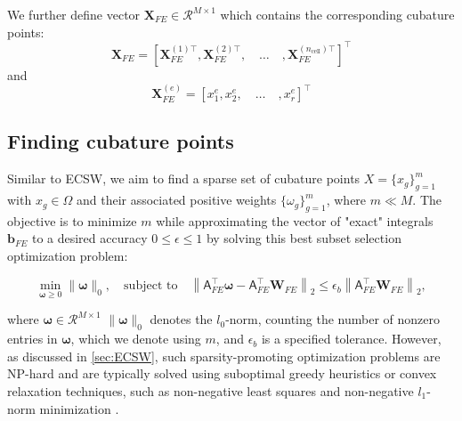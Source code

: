 \documentclass[11pt]{article}
\renewcommand{\vec}[1]{\mathbf{#1}}
\newcommand{\mat}[1]{\mathsf{#1}}
\begin{document}
            We further define vector $\vec{X}_{FE}\in\mathcal{R}^{M\times 1}$ which contains  the corresponding cubature points:
            \begin{equation}
            \mathbf{X}_{FE} = \left[\vec{X}_{FE}^{(1)\top},
            \vec{X}_{FE}^{(2)\top},\quad
            \hdots\quad
            ,\vec{X}_{FE}^{(n_{\text{cell}})\top}\right]^\top
            \label{eq:X_points}
            \end{equation}
            and
            \begin{equation}
            \vec{X}_{FE}^{(e)} = \left[ x_1^e, x_2^e, \quad\hdots\quad, x_r^e \right]^\top
            \end{equation}





            \subsection*{Finding cubature points}
            Similar to ECSW, we aim to find a sparse set of cubature points \( X = \{ x_g \}_{g=1}^{m} \) with \( x_g \in \Omega \) and their associated positive weights \( \{ \omega_g \}_{g=1}^{m} \), where \( m \ll M \).
            The objective is to minimize \( m \) while approximating the vector of "exact" integrals \( \mathbf{b}_{FE} \) to a desired accuracy \( 0 \leq \epsilon \leq 1 \) by solving this best subset selection optimization problem:










            \begin{equation}
            \min_{\boldsymbol{\omega} \geq 0} \| \boldsymbol{\omega} \|_0, \quad \text{subject to} \quad \left\| \mat{A}_{FE}^\top \boldsymbol{\omega} - \mat{A}_{FE}^\top \vec{W}_{FE} \right\|_2 \leq \epsilon_b \left\| \mat{A}_{FE}^\top \vec{W}_{FE} \right\|_2,
            \label{eq:ecm_opt2}
            \end{equation}

            where $\boldsymbol{\omega}\in\mathcal{R}^{M\times 1}$ \(\| \boldsymbol{\omega} \|_0\) denotes the \(l_0\)-norm, counting the number of nonzero entries in \(\boldsymbol{\omega}\), which we denote using $m$, and \(\epsilon_b\) is a specified tolerance.
            However, as discussed in \cref{sec:ECSW}, such sparsity-promoting optimization problems are NP-hard and are typically solved using suboptimal greedy heuristics or convex relaxation techniques, such as non-negative least squares \cite{NNLSLawsonHanson1995,fastnnls1997} and non-negative \(l_1\)-norm minimization \cite{Patera_2017_EQP}.
\end{document}
